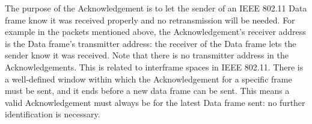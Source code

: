 The purpose of the Acknowledgement is to let the sender of an IEEE 802.11 Data frame know it was received properly and no retransmission will be needed. For example in the packets mentioned above, the Acknowledgement's receiver address is the Data frame's transmitter address: the receiver of the Data frame lets the sender know it was received. Note that there is no transmitter address in the Acknowledgements. This is related to interframe spaces in IEEE 802.11. There is a well-defined window within which the Acknowledgement for a specific frame must be sent, and it ends before a new data frame can be sent. This means a valid Acknowledgement must always be for the latest Data frame sent: no further identification is necessary.
